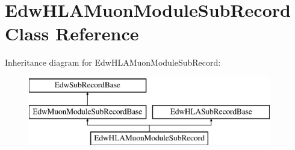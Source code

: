 \hypertarget{class_edw_h_l_a_muon_module_sub_record}{
\section{EdwHLAMuonModuleSubRecord Class Reference}
\label{class_edw_h_l_a_muon_module_sub_record}
}
Inheritance diagram for EdwHLAMuonModuleSubRecord:\begin{figure}[H]
\begin{center}
\leavevmode
\includegraphics[height=3cm]{class_edw_h_l_a_muon_module_sub_record}
\end{center}
\end{figure}
